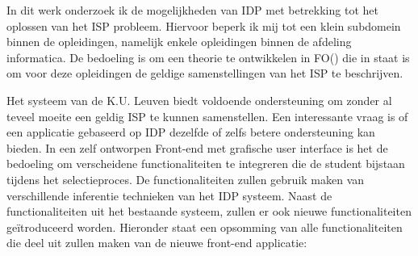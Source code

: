 In dit werk onderzoek ik de mogelijkheden van IDP met betrekking tot het oplossen van het ISP probleem. Hiervoor beperk ik mij tot een klein subdomein binnen de opleidingen, namelijk enkele opleidingen binnen de afdeling informatica. De bedoeling is om een theorie te ontwikkelen in FO(\textperiodcentered) die in staat is om voor deze opleidingen de geldige samenstellingen van het ISP te beschrijven. 

Het systeem van de K.U. Leuven biedt voldoende ondersteuning om zonder al teveel moeite een geldig ISP te kunnen samenstellen. Een interessante vraag is of een applicatie gebaseerd op IDP dezelfde of zelfs betere ondersteuning kan bieden. In een zelf ontworpen Front-end met grafische user interface is het de bedoeling om verscheidene functionaliteiten te integreren die de student bijstaan tijdens het selectieproces. De functionaliteiten zullen gebruik maken van verschillende inferentie technieken van het IDP systeem. Naast de functionaliteiten uit het bestaande systeem, zullen er ook nieuwe functionaliteiten ge\"{i}troduceerd worden. Hieronder staat een opsomming van alle functionaliteiten die deel uit zullen maken van de nieuwe front-end applicatie:
